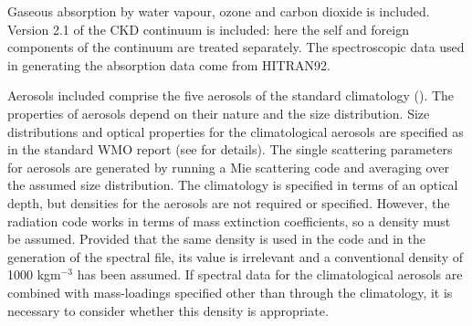 \begin{enumerate}
Gaseous absorption by water vapour, ozone and carbon dioxide
is included. Version 2.1 of the CKD continuum is included: here
the self and foreign components of the continuum are treated
separately. 
The spectroscopic data used in generating the absorption data come from 
HITRAN92.

Aerosols included comprise the five aerosols of the standard climatology
(\citet{Cusack98a}).
The properties of aerosols depend on their nature and the size distribution.
Size distributions and optical properties for the climatological aerosols
are specified as in the standard WMO report (see \citet{Cusack98a} for
details). 
The single scattering parameters for aerosols are generated by running a 
Mie scattering code and averaging over the assumed size distribution.
The climatology is specified in terms of an optical depth, but densities
for the aerosols are not required or specified. However, the radiation
code works in terms of mass extinction coefficients, so a density must
be assumed. Provided that the same density is used in the code and in
the generation of the spectral file, its value is irrelevant and a 
conventional density of 1000 kgm${}^{-3}$ has been assumed. If spectral
data for the climatological aerosols are combined with mass-loadings
specified other than through the climatology, it is necessary to
consider whether this density is appropriate.


\end{enumerate}
